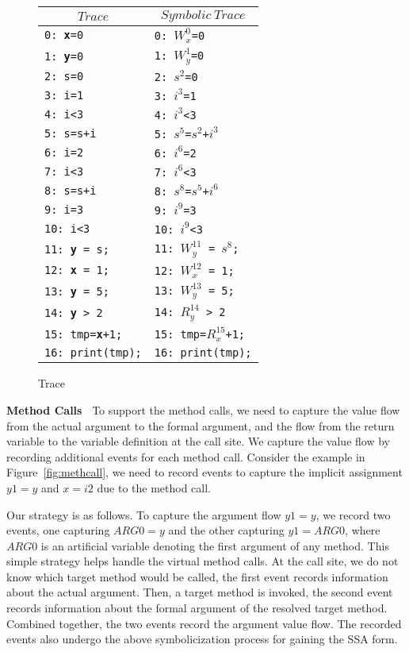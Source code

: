 \begin{figure}
\centering
\begin{tabular}{l|l}
\hline
\multicolumn{1}{c}{$Trace$} & \multicolumn{1}{c}{$Symbolic\  Trace$} \\
\hline
{\tt 0: {\bf x}=0} &  {\tt 0: $W^0_x$=0}    \\
{\tt 1: {\bf y}=0} &   {\tt 1: $W^1_y$=0}   \\
{\tt 2: s=0} &  {\tt 2: $s^2$=0}   \\
{\tt 3: i=1} &     {\tt 3: $i^3$=1}   \\
{\tt 4: i<3} &    {\tt 4: $i^3$<3} \\
{\tt 5: s=s+i} & {\tt 5: $s^5$=$s^2$+$i^3$}   \\
{\tt 6: i=2} &       {\tt 6: $i^6$=2}  \\
{\tt 7: i<3} &      {\tt 7: $i^6$<3}  \\
{\tt 8: s=s+i} &  {\tt 8: $s^8$=$s^5$+$i^6$}  \\
{\tt 9: i=3} &     {\tt 9: $i^9$=3}  \\
{\tt 10: i<3} &    {\tt 10: $i^9$<3}  \\
{\tt 11: {\bf y} = s;} &  {\tt 11: $W^{11}_y$ = $s^8$;}  \\
{\tt 12: {\bf x} = 1;} &    {\tt 12: $W^{12}_x$ = 1;}   \\
{\tt 13: {\bf y} = 5;} &    {\tt 13: $W^{13}_y$ = 5;}  \\
{\tt 14: {\bf y} > 2}  &    {\tt 14: $R^{14}_y$ > 2} \\
{\tt 15: tmp={\bf x}+1;}  & {\tt 15: tmp=$R^{15}_x$+1;}   \\	
{\tt 16: print(tmp);} &  {\tt 16: print(tmp);}  \\
\end{tabular}
\caption{Trace}
\label{fig:t4running2}
\end{figure}



{\bf Method Calls\ } To support the method calls, we need to capture the value flow from the actual argument to the formal argument, and the flow from the return variable to the variable definition at the call site. We capture the value flow by recording additional events for each method call.
Consider the example in Figure~\ref{fig:methcall},   we need to record events to capture the implicit assignment $y1=y$ and $x=i2$ due to the method call. 

Our strategy is as follows. To capture the argument flow $y1=y$, we record two events, one capturing $ARG0=y$ and the other capturing $y1=ARG0$, where $ARG0$ is an artificial variable denoting the first argument of any method. This simple strategy helps handle the virtual method calls. 
At the call site, we do not know which target method would be called, the first event records  information about the actual argument. Then, a target method is invoked, the second event records information about the formal argument of the resolved target method. Combined together, the two events record the argument value flow.  The recorded events also undergo the above symbolicization process for gaining the SSA form.





